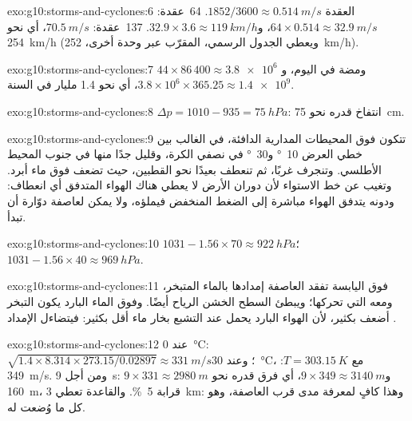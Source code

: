 \begin{solution}{exo:g10:storms-and-cyclones:6}
العقدة $1852/3600 \approx \qty{0.514}{m/s}$. \num{64}~عقدة: $64 \times
0.514 \approx \qty{32.9}{m/s}$، و$32.9 \times 3.6 \approx
\qty{119}{km/h}$. \num{137}~عقدة: $\qty{70.5}{m/s}$، أي نحو
\qty{254}{km/h} (ويعطي الجدول الرسمي، المقرّب عبر وحدة أخرى،
\qty{252}{km/h}).
\end{solution}

\begin{solution}{exo:g10:storms-and-cyclones:7}
$44 \times 86\,400 \approx \num{3.8e6}$ ومضة في اليوم، و$3.8\times10^6
\times 365.25 \approx \num{1.4e9}$، أي نحو 1.4 مليار في السنة.
\end{solution}

\begin{solution}{exo:g10:storms-and-cyclones:8}
$\Delta p = 1010 - 935 = \qty{75}{hPa}$: انتفاخ قدره نحو \qty{75}{cm}.
\end{solution}

\begin{solution}{exo:g10:storms-and-cyclones:9}
تتكون فوق المحيطات المدارية الدافئة، في الغالب بين خطي العرض \qty{10}{\degree}
و\qty{30}{\degree} في نصفي الكرة، وقليل جدًا منها في جنوب المحيط الأطلسي. وتنجرف
غربًا، ثم تنعطف بعيدًا نحو القطبين، حيث تضعف فوق ماء أبرد. وتغيب عن خط الاستواء
لأن دوران الأرض لا يعطي هناك الهواء المتدفق أي انعطاف: ودونه يتدفق الهواء مباشرة
إلى الضغط المنخفض فيملؤه، ولا يمكن لعاصفة دوّارة أن تبدأ.
\end{solution}

\begin{solution}{exo:g10:storms-and-cyclones:10}
$1031 - 1.56 \times 70 \approx \qty{922}{hPa}$؛ $1031 - 1.56 \times 40
\approx \qty{969}{hPa}$.
\end{solution}

\begin{solution}{exo:g10:storms-and-cyclones:11}
فوق اليابسة تفقد العاصفة إمدادها بالماء المتبخر، ومعه  التي
تحركها؛ ويبطئ السطح الخشن الرياح أيضًا. وفوق الماء البارد يكون التبخر أضعف بكثير،
لأن الهواء البارد يحمل عند التشبع بخار ماء أقل بكثير: فيتضاءل الإمداد .
\end{solution}

\begin{solution}{exo:g10:storms-and-cyclones:12}
عند \qty{0}{\degreeCelsius}: $\sqrt{1.4 \times 8.314 \times 273.15/0.02897}
\approx \qty{331}{m/s}$؛ وعند \qty{30}{\degreeCelsius}، مع $T =
\qty{303.15}{K}$: \qty{349}{m/s}. ومن أجل \qty{9}{s}: $9 \times 331 \approx
\qty{2980}{m}$ و$9 \times 349 \approx \qty{3140}{m}$، أي فرق قدره نحو
\qty{160}{m}، قرابة \qty{5}{\percent}. والقاعدة تعطي \qty{3}{km}: وهذا كافٍ لمعرفة
مدى قرب العاصفة، وهو كل ما وُضعت له.
\end{solution}

